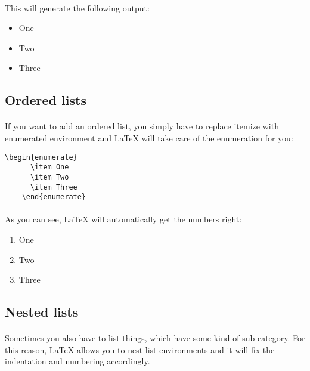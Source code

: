   \paragraph{}
  This will generate the following output:
  \begin{itemize}
    \item One
    \item Two
    \item Three
  \end{itemize}

  \subsection{Ordered lists}
  \paragraph{}
  If you want to add an ordered list, you simply have to replace itemize with enumerated environment and LaTeX will take care of the enumeration for you:

  \begin{lstlisting}[language={[LaTeX]TeX},breaklines=true,frame=single]
    \begin{enumerate}
      \item One
      \item Two
      \item Three
    \end{enumerate}
  \end{lstlisting}

  \paragraph{}
  As you can see, LaTeX will automatically get the numbers right:
  \begin{enumerate}
    \item One
    \item Two
    \item Three
  \end{enumerate}

  \subsection{Nested lists}
  \paragraph{}
  Sometimes you also have to list things, which have some kind of sub-category. For this reason, LaTeX allows you to nest list environments and it will fix the indentation and numbering accordingly.

